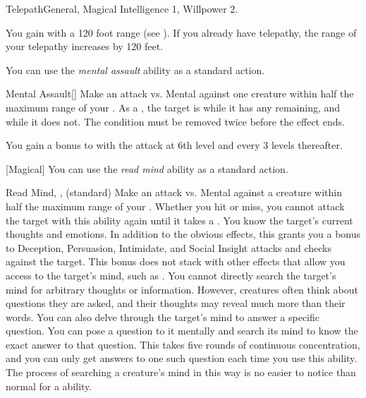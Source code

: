     \begin{feat}{Telepath}{General, Magical}
        \featpre Intelligence 1, Willpower 2.

         You gain  with a 120 foot range (see ).
        If you already have telepathy, the range of your telepathy increases by 120 feet.

         You can use the \textit{mental assault} ability as a standard action.
        \begin{activeability}{Mental Assault}[]
            \rankline
            Make an attack vs. Mental against one creature within half the maximum range of your .
            \hit As a , the target is \dazed while it has any  remaining, and \stunned while it does not.
            \crit The condition must be removed twice before the effect ends.

            \rankline
            You gain a  bonus to  with the attack at 6th level and every 3 levels thereafter.
        \end{activeability}

        [Magical] You can use the \textit{read mind} ability as a standard action.
        \begin{sustainability}{Read Mind}{, ,  (standard)}
            \rankline
            Make an attack vs. Mental against a creature within half the maximum range of your .
            Whether you hit or miss, you cannot attack the target with this ability again until it takes a .
            \hit You know the target's current thoughts and emotions.
            In addition to the obvious effects, this grants you a  bonus to Deception, Persuasion, Intimidate, and Social Insight attacks and checks against the target.
            This bonus does not stack with other effects that allow you access to the target's mind, such as .
            You cannot directly search the target's mind for arbitrary thoughts or information.
            However, creatures often think about questions they are asked, and their thoughts may reveal much more than their words.
            \crit You can also delve through the target's mind to answer a specific question.
            You can pose a question to it mentally and search its mind to know the exact answer to that question.
            This takes five rounds of continuous concentration, and you can only get answers to one such question each time you use this ability.
            The process of searching a creature's mind in this way is no easier to notice than normal for a  ability.


\end{sustainability}
\end{feat}
